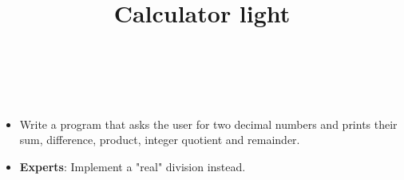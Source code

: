 


\title{Calculator light} %
\author{} %
\renewcommand{\difficulty}{Easy} %
\renewcommand{\requirements}{Input/output, operators} %
\renewcommand{\aims}{Coding with operators} %


 \maketitle
 \taskinfos

\ \\\ \\
\begin{itemize}
	\item Write a program that asks the user for two decimal numbers and prints their sum, difference, product, integer quotient and remainder.
	\item \textbf{Experts}: Implement a "real" division instead.
\end{itemize}
 
 


